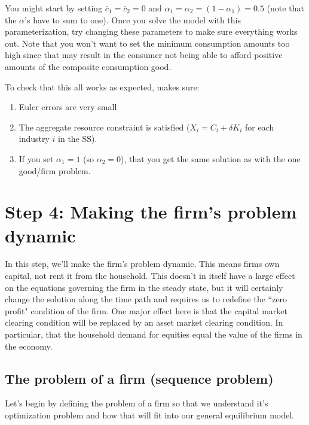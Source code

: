 \documentclass[letterpaper,12pt]{article}
\theoremstyle{definition}
\begin{document}
\begin{spacing}{1.5}
You might start by setting $\bar{c}_{1}=\bar{c}_{2}=0$ and $\alpha_{1}=\alpha_{2}=(1-\alpha_{1})=0.5$ (note that the $\alpha$'s have to sum to one).  Once you solve the model with this parameterization, try changing these parameters to make sure everything works out.  Note that you won't want to set the minimum consumption amounts too high since that may result in the consumer not being able to afford positive amounts of the composite consumption good.

To check that this all works as expected, makes sure:
\begin{enumerate}
\item Euler errors are very small
\item The aggregate resource constraint is satisfied ($X_{i}=C_{i}+\delta K_{i}$ for each industry $i$ in the SS).
\item If you set $\alpha_{1}=1$ (so $\alpha_{2}=0$), that you get the same solution as with the one good/firm problem.
\end{enumerate}

\section*{Step 4: Making the firm's problem dynamic}

In this step, we'll make the firm's problem dynamic. This means firms own capital, not rent it from the household.  This doesn't in itself have a large effect on the equations governing the firm in the steady state, but it will certainly change the solution along the time path and requires us to redefine the ``zero profit" condition of the firm. One major effect here is that the capital market clearing condition will be replaced by an asset market clearing condition.  In particular, that the household demand for equities equal the value of the firms in the economy.

\subsection*{The problem of a firm (sequence problem)}

Let's begin by defining the problem of a firm so that we understand it's optimization problem and how that will fit into our general equilibrium model.


\end{spacing}
\end{document}
